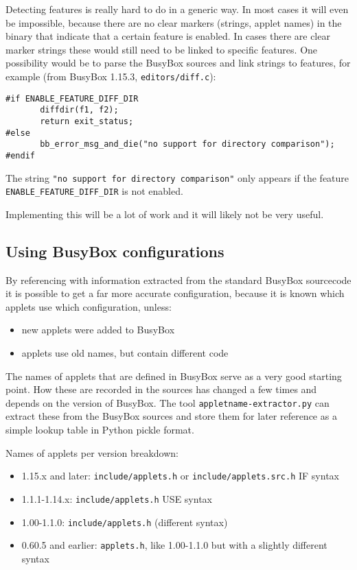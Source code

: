 \documentclass[10pt,a4paper]{article}
\begin{document}
Detecting features is really hard to do in a generic way. In most cases it will
even be impossible, because there are no clear markers (strings, applet names)
in the binary that indicate that a certain feature is enabled. In cases there
are clear marker strings these would still need to be linked to specific
features. One possibility would be to parse the BusyBox sources and link
strings to features, for example (from BusyBox 1.15.3,
\texttt{editors/diff.c}):

\begin{verbatim}
#if ENABLE_FEATURE_DIFF_DIR
       diffdir(f1, f2);
       return exit_status;
#else
       bb_error_msg_and_die("no support for directory comparison");
#endif
\end{verbatim}

The string \texttt{"no support for directory comparison"} only appears if the
feature \texttt{ENABLE\_FEATURE\_DIFF\_DIR} is not enabled.

Implementing this will be a lot of work and it will likely not be very useful.

\subsection{Using BusyBox configurations}

By referencing with information extracted from the standard BusyBox sourcecode
it is possible to get a far more accurate configuration, because it is known
which applets use which configuration, unless:

\begin{itemize}
\item new applets were added to BusyBox
\item applets use old names, but contain different code
\end{itemize}

The names of applets that are defined in BusyBox serve as a very good starting
point. How these are recorded in the sources has changed a few times and
depends on the version of BusyBox. The tool \texttt{appletname-extractor.py}
can extract these from the BusyBox sources and store them for later reference
as a simple lookup table in Python pickle format.

Names of applets per version breakdown:

\begin{itemize}
\item 1.15.x and later: \texttt{include/applets.h} or
\texttt{include/applets.src.h} IF syntax
\item 1.1.1-1.14.x: \texttt{include/applets.h} USE syntax
\item 1.00-1.1.0: \texttt{include/applets.h} (different syntax)
\item 0.60.5 and earlier: \texttt{applets.h}, like 1.00-1.1.0 but with a
slightly different syntax
\end{itemize}
\end{document}
